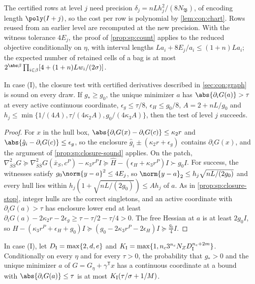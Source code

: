 The certified rows at level $j$ need precision
$\delta_j=nLh_j^2/(8N_{\mathfrak B})$, of encoding length $\poly(I+j)$, so the
cost per row is polynomial by \cref{lem:con:chart}. Rows reused from an
earlier level are recomputed at the new precision. With the witness tolerance
$4E_j$, the proof of \cref{prop:sp:count} applies to the reduced objective
conditionally on $\eta$, with interval lengths
$La_i+8E_j/a_i\le(1+n)La_i$; the expected number of retained cells of a bag
is at most $2^{\abs\beta}\prod_{i\in\beta}[4+(1+n)Lw_i/(2\sigma)]$.

\begin{lemma}\label{lem:con:approx-closure}
In case (I), the closure test with certified derivatives described in
\cref{sec:con:graph} is sound on every draw. If $g_*\ge g_0$, the unique
minimizer $a$ has $\abs{\partial_iG(a)}>\tau$ at every active continuous
coordinate, $\epsilon_g\le\tau/8$, $\epsilon_H\le g_0/8$, $A=2+nL/g_0$ and
$h_j\le\min\{1/(4A),\tau/(4\kappa_2A),g_0/(4\kappa_3A)\}$, then the test of
level $j$ succeeds.
\end{lemma}

\begin{proof}
For $x$ in the hull box, $\abs{\partial_iG(x)-\partial_iG(c)}\le\kappa_2r$ and
$\abs{\hat g_i-\partial_iG(c)}\le\epsilon_g$, so the enclosure
$\hat g_i\pm(\kappa_2r+\epsilon_g)$ contains $\partial_iG(x)$, and the
argument of \cref{prop:sp:closure-sound} applies. On the patch,
$\nabla^2_{\bar S\bar S}G\succeq\nabla^2_{\bar S\bar S}G(\bar x_S,c^P)-\kappa_3r^PI
\succeq\hat H-(\epsilon_H+\kappa_3r^P)I\succ g_0I$. For success, the witnesses
satisfy $g_0\norm{y-a}^2\le4E_j$, so $\norm{y-a}_2\le h_j\sqrt{nL/(2g_0)}$ and
every hull lies within $h_j(1+\sqrt{nL/(2g_0)})\le Ah_j$ of $a$. As in
\cref{prop:sp:closure-stop}, integer hulls are the correct singletons, and an
active coordinate with $\partial_iG(a)>\tau$ has enclosure lower end at least
$\partial_iG(a)-2\kappa_2r-2\epsilon_g\ge\tau-\tau/2-\tau/4>0$. The free
Hessian at $a$ is at least $2g_0I$, so
$\hat H-(\kappa_3r^P+\epsilon_H+g_0)I\succeq
(g_0-2\kappa_3r^P-2\epsilon_H)I\succeq\frac{g_0}4I$.
\end{proof}

\begin{lemma}\label{lem:con:kkt}
In case (I), let $D_{\rm I}=\max\{2,d,e\}$ and
$K_{\rm I}=\max\{1,n_c3^{n_c}N_ZD_{\rm I}^{n_c+2m}\}$. Conditionally on every
$\eta$ and for every $\tau>0$, the probability that $g_*>0$ and the unique
minimizer $a$ of $G=G_\eta+\gamma^{\mathsf T}x$ has a continuous coordinate
at a bound with $\abs{\partial_iG(a)}\le\tau$ is at most
$K_{\rm I}(\tau/\sigma+1/M)$.
\end{lemma}

